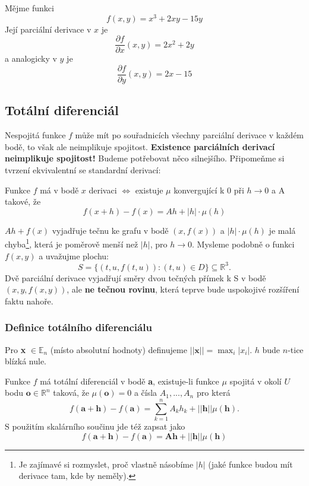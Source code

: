 \documentclass[../main.tex]{subfiles}
\begin{document}
\begin{example}
	Mějme funkci \[f(x, y) = x^3 + 2xy - 15y\]
	Její parciální derivace v \(x\) je \[\frac{\partial f}{\partial x} (x, y) = 2x^2 + 2y\]
	a analogicky v \(y\) je \[\frac{\partial f}{\partial y} (x, y) = 2x - 15\]
\end{example}

\subsection{Totální diferenciál}
Nespojitá funkce $f$ může mít po souřadnicích všechny parciální derivace v každém bodě, to však ale neimplikuje spojitost.
\textbf{Existence parciálních derivací neimplikuje spojitost!}
Budeme potřebovat něco silnejšího. Připomeňme si tvrzení ekvivalentní se standardní derivací:

\begin{lemma}
	Funkce \(f\) má v bodě \(x\) derivaci \(\iff\)  existuje $\mu$ konvergující k 0 při $h \rightarrow 0$ a A takové, že 
	\[f(x+h) - f(x) = Ah + |h| \cdot \mu(h)\]
\end{lemma}

\begin{intuition}
	$Ah + f(x) $ vyjadřuje tečnu ke grafu v bodě $(x,f(x))$ a $|h|\cdot \mu(h)$ je malá chyba\footnote{Je zajímavé si rozmyslet, proč vlastně násobíme \(|h|\) (jaké funkce budou mít derivace tam, kde by neměly).}, která je poměrově menší než \(|h|\), pro \(h \rightarrow 0\).
	Mysleme podobně o funkci $f(x,y)$ a uvažujme plochu:
	\[S = \{(t,u,f(t,u)) : (t,u) \in D\} \subseteq \mathbb{R}^3.\]
	Dvě parciální derivace vyjadřují směry dvou tečných přímek k S v bodě $(x,y,f(x,y))$, ale \textbf{ne tečnou rovinu},
	která teprve bude uspokojivé rozšíření faktu nahoře.
\end{intuition}

\subsubsection{Definice totálního diferenciálu}
Pro \textbf{x} $\in \mathbb{E}_n$ (místo absolutní hodnoty) definujeme \(||\textbf{x}||  = \max_i|x_i|\). $h$ bude $n$-tice blízká nule.

\begin{definition}
	Funkce $f$ má totální diferenciál v bodě \textbf{a}, existuje-li funkce $\mu$ spojitá v okolí $U$ bodu $\textbf{o} \in \mathbb{R}^n$ taková, že $\mu(\textbf{o}) = 0$
	a čísla $A_1,...,A_n$ pro která
	\[f(\textbf{a}+\textbf{h}) - f(\textbf{a}) = \sum^n_{k=1}A_kh_k+||\textbf{h}||\mu(\textbf{h}).\]
	S použitím skalárního součinu jde též zapsat jako
	$$f(\textbf{a} + \textbf{h}) - f(\textbf{a}) = \textbf{Ah} + ||\textbf{h}|| \mu (\textbf{h})$$
\end{definition}
\end{document}
